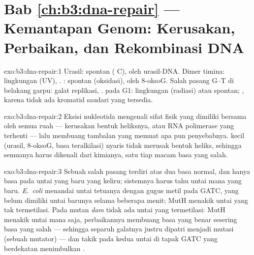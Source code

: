 \section*{Bab \ref{ch:b3:dna-repair} --- Kemantapan Genom: Kerusakan, Perbaikan, dan Rekombinasi DNA}

\begin{solution}{exo:b3:dna-repair:1}
Urasil: spontan ( C),  oleh
 urasil-DNA. Dimer timina: lingkungan (UV), . : spontan (oksidasi),  oleh  8-oksoG. Salah pasang G--T di belakang garpu:
galat replikasi, .  pada G1:
lingkungan (radiasi) atau spontan; ,
karena tidak ada kromatid saudari yang tersedia.
\end{solution}

\begin{solution}{exo:b3:dna-repair:2}
Eksisi nukleotida mengenali sifat fisik yang dimiliki bersama oleh semua
 ruah --- kerusakan bentuk heliksnya, atau RNA polimerase yang terhenti
--- lalu membuang tambalan yang memuat apa pun penyebabnya.  kecil
(urasil, 8-oksoG, basa teralkilasi) nyaris tidak merusak bentuk heliks,
sehingga semuanya harus dikenali dari kimianya, satu  tiap macam
basa yang salah.
\end{solution}

\begin{solution}{exo:b3:dna-repair:3}
Sebuah salah pasang terdiri atas dua basa normal, dan hanya basa pada untai
yang baru yang keliru; sistemnya harus tahu untai mana yang baru.
\emph{E.~coli} menandai untai tetuanya dengan gugus metil pada GATC,
yang belum dimiliki untai barunya selama beberapa menit; MutH menakik untai
yang tak termetilasi. Pada mutan \emph{dam} tidak ada untai yang
termetilasi: MutH menakik untai mana saja, perbaikannya membuang basa yang
benar sesering basa yang salah --- sehingga separuh galatnya justru dipatri
menjadi mutasi (sebuah mutator) --- dan takik pada kedua untai di tapak GATC
yang berdekatan menimbulkan .
\end{solution}

